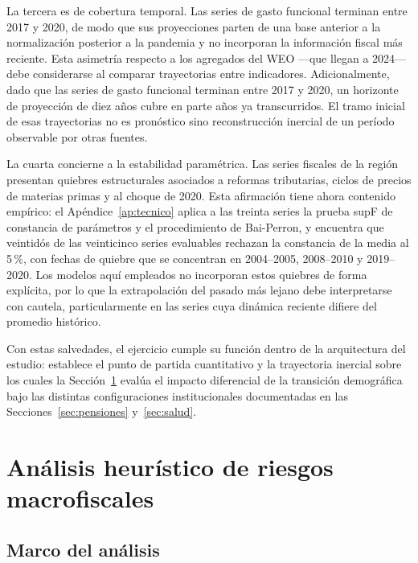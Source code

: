 \documentclass[12pt, letterpaper]{article}
\begin{document}
La tercera es de cobertura temporal. Las series de gasto funcional terminan entre 2017
y 2020, de modo que sus proyecciones parten de una base anterior a la normalización
posterior a la pandemia y no incorporan la información fiscal más reciente. Esta
asimetría respecto a los agregados del WEO —que llegan a 2024— debe considerarse al
comparar trayectorias entre indicadores. Adicionalmente, dado que las series de
gasto funcional terminan entre 2017 y 2020, un horizonte de proyección de diez años
cubre en parte años ya transcurridos. El tramo inicial de esas trayectorias no es
pronóstico sino reconstrucción inercial de un período observable por otras fuentes.

La cuarta concierne a la estabilidad paramétrica. Las series fiscales de la región
presentan quiebres estructurales asociados a reformas tributarias, ciclos de
precios de materias primas y al choque de 2020. Esta afirmación tiene ahora
contenido empírico: el Apéndice~\ref{ap:tecnico} aplica a las treinta series la
prueba supF de constancia de parámetros y el procedimiento de Bai-Perron, y
encuentra que veintidós de las veinticinco series evaluables rechazan la constancia
de la media al 5\,\%, con fechas de quiebre que se concentran en 2004--2005,
2008--2010 y 2019--2020. Los modelos aquí empleados no incorporan estos quiebres de
forma explícita, por lo que la extrapolación del pasado más lejano debe
interpretarse con cautela, particularmente en las series cuya dinámica reciente
difiere del promedio histórico.

Con estas salvedades, el ejercicio cumple su función dentro de la arquitectura del
estudio: establece el punto de partida cuantitativo y la trayectoria inercial sobre
los cuales la Sección~\ref{sec:riesgos} evalúa el impacto diferencial de la
transición demográfica bajo las distintas configuraciones institucionales
documentadas en las Secciones~\ref{sec:pensiones} y~\ref{sec:salud}.







\newpage
\section{Análisis heurístico de riesgos macrofiscales}
\label{sec:riesgos}

\subsection{Marco del análisis}
\label{sec:marco-riesgos}
\end{document}
